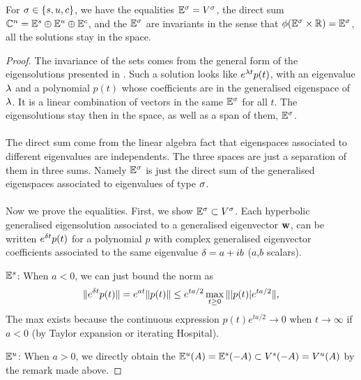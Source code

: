 \begin{lemme}
    For $\sigma\in\{s,u,c\}$, we have the equalities $\mathbb{E}^\sigma=V^\sigma$, the direct sum $\mathbb{C}^n = \mathbb{E}^s\oplus\mathbb{E}^u\oplus\mathbb{E}^c$, and the $\mathbb{E}^\sigma$ are invariants in the sense that $\phi(\mathbb{E}^\sigma\times\mathbb{R})=\mathbb{E}^\sigma$, \ie all the solutions stay in the space.
\end{lemme}
\begin{proof}
The invariance of the sets comes from the general form of the eigensolutions presented in . Such a solution looks like $e^{\lambda t}p(t)$, with an eigenvalue $\lambda$ and a polynomial $p(t)$ whose coefficients are in the generalised eigenspace of $\lambda$. It is a linear combination of vectors in the same $\mathbb{E}^\sigma$ for all $t$. The eigensolutions stay then in the space, as well as a span of them, $\mathbb{E}^\sigma$.
\\ \\
The direct sum come from the linear algebra fact that eigenspaces associated to different eigenvalues are independents. The three spaces are just a separation of them in three sums. Namely $\mathbb{E}^\sigma$ is just the direct sum of the generalised eigenspaces associated to eigenvalues of type $\sigma$.
\\ \\
Now we prove the equalities. First, we show $\mathbb{E}^\sigma\subset V^\sigma$. Each hyperbolic generalised eigensolution associated to a generalised eigenvector $\mathbf{w}$, can be written $e^{\delta t}p(t)$ for a  polynomial $p$ with complex generalised eigenvector coefficients associated to the same eigenvalue $\delta=a+ib$ ($a$,$b$ scalars).

$\mathbb{E}^s$: When $a<0$, we can just bound the norm as 
$$\|e^{\delta t}p(t)\|=e^{at}\|p(t)\| \leq e^{ta/2} \max_{t\geq0}\||p(t)|e^{ta/2}\| ,$$
The max exists because the continuous expression $p(t)e^{ta/2}\to 0$ when $t\to\infty$ if $a<0$ (by Taylor expansion or iterating Hospital).

$\mathbb{E}^u$: When $a>0$, we directly obtain the $\mathbb{E}^u(A) = \mathbb{E}^s(-A) \subset V^s(-A) = V^u(A)$ by the remark made above.


\end{proof}
